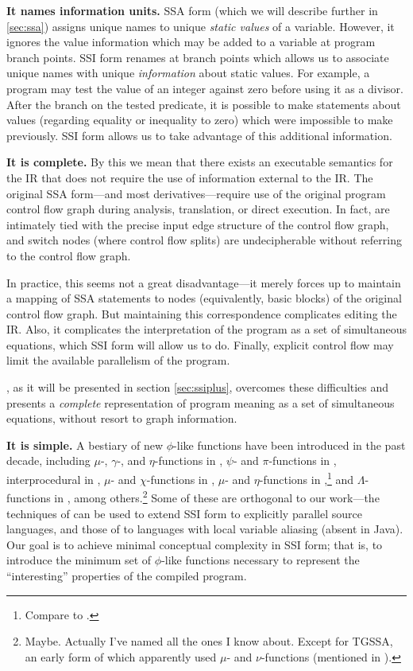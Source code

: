 \documentclass[12pt,titlepage]{article}
\begin{document}
\textbf{It names information units.}  SSA form (which we will describe
further in \ref{sec:ssa}) assigns unique names to unique \emph{static
values} of a variable.  However, it ignores the value information
which may be added to a variable at program branch points.  SSI form
renames at branch points which allows us to associate unique names
with unique \emph{information} about static values.  For example, a
program may test the value of an integer against zero before using it
as a divisor.  After the branch on the tested predicate, it is
possible to make statements about values (regarding equality or
inequality to zero) which were impossible to make previously.  SSI
form allows us to take advantage of this additional information.

\textbf{It is complete.}\label{sec:complete}
By this we mean that there exists an
executable semantics for the IR that does not require the use of
information external to the IR.  The original SSA form---and most
derivatives---require use of the original program control flow graph
during analysis, translation, or direct execution.  In fact,
 are intimately tied with the precise input edge
structure of the control flow graph, and switch nodes (where control
flow splits) are undecipherable without referring to the control flow
graph.

In practice, this seems not a great disadvantage---it merely forces up to
maintain a mapping of SSA statements to nodes (equivalently, basic
blocks) of the original control flow graph.  But maintaining this
correspondence complicates editing the IR.  Also, it complicates the
interpretation of the program as a set of simultaneous equations,
which SSI form will allow us to do.  Finally, explicit control flow
may limit the available parallelism of the program.

\ssiplus, as it will be presented in section \ref{sec:ssiplus},
overcomes these difficulties and presents a \emph{complete}
representation of program meaning as a set of simultaneous equations,
without resort to graph information.

\textbf{It is simple.}  A bestiary of new $\phi$-like functions have
been introduced in the past decade, including
$\mu$-, $\gamma$-, and $\eta$-functions in \cite{ballance90:pdw,tu95:gssa},
$\psi$- and $\pi$-functions in \cite{lee99:parssa},
interprocedural  in \cite{liao99:issa},
$\mu$- and $\chi$-functions in \cite{chow96:hssa},
$\mu$- and $\eta$-functions in \cite{gerlek95:inductssa},\footnote{Compare to
\cite{ballance90:pdw,tu95:gssa}.} and $\Lambda$-functions in \cite{lo98:ssu},
among others.\footnote{Maybe.
Actually I've named all the ones I know about.  Except for TGSSA,
an early form of which apparently used $\mu$- and $\nu$-functions (mentioned in
\cite{weise94:vdg}).}
Some of these are orthogonal to our work---the techniques of
\cite{lee99:parssa} can be used to extend SSI form to explicitly
parallel source languages, and those of \cite{chow96:hssa} to
languages with local variable aliasing (absent in Java).  Our goal is
to achieve minimal conceptual complexity in SSI form; that is, to
introduce the minimum set of $\phi$-like functions necessary to
represent the ``interesting'' properties of the compiled program.
\end{document}
